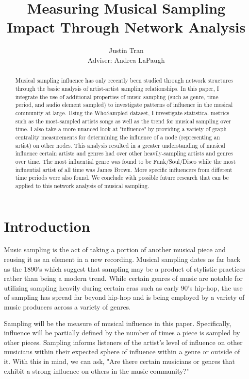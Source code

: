 \documentclass[pageno]{jpaper}
\begin{document}
\title{Measuring Musical Sampling Impact Through Network Analysis}

\author{Justin Tran\\Adviser: Andrea LaPaugh}

\date{}
\maketitle

\thispagestyle{empty}
\doublespacing
\begin{abstract}
Musical sampling influence has only recently been studied through network structures through the basic analysis of artist-artist sampling relationships. In this paper, I integrate the use of additional properties of music sampling (such as genre, time period, and audio element sampled) to investigate patterns of influence in the musical community at large. Using the WhoSampled dataset, I investigate statistical metrics such as the most-sampled artists songs as well as the trend for musical sampling over time. I also take a more nuanced look at "influence" by providing a variety of graph centrality measurements for determining the influence of a node (representing an artist) on other nodes. This analysis resulted in a greater understanding of musical influence certain artists and genres had over other heavily-sampling artists and genres over time. The most influential genre was found to be Funk/Soul/Disco while the most influential artist of all time was James Brown. More specific influencers from different time periods were also found. We conclude with possible future research that can be applied to this network analysis of musical sampling.
\end{abstract}

\section{Introduction}
Music sampling is the act of taking a portion of another musical piece and reusing it as an element in a new recording. Musical sampling dates as far back as the 1890’s which suggest that sampling may be a product of stylistic practices rather than being a modern trend. While certain genres of music are notable for utilizing sampling heavily during certain eras such as early 90’s hip-hop, the use of sampling has spread far beyond hip-hop and is being employed by a variety of music producers across a variety of genres.

Sampling will be the measure of musical influence in this paper. Specifically, influence will be partially defined by the number of times a piece is sampled by other pieces. Sampling informs listeners of the artist’s level of influence on other musicians within their expected sphere of influence within a genre or outside of it. With this in mind, we can ask, "Are there certain musicians or genres that exhibit a strong influence on others in the music community?" 
\end{document}

